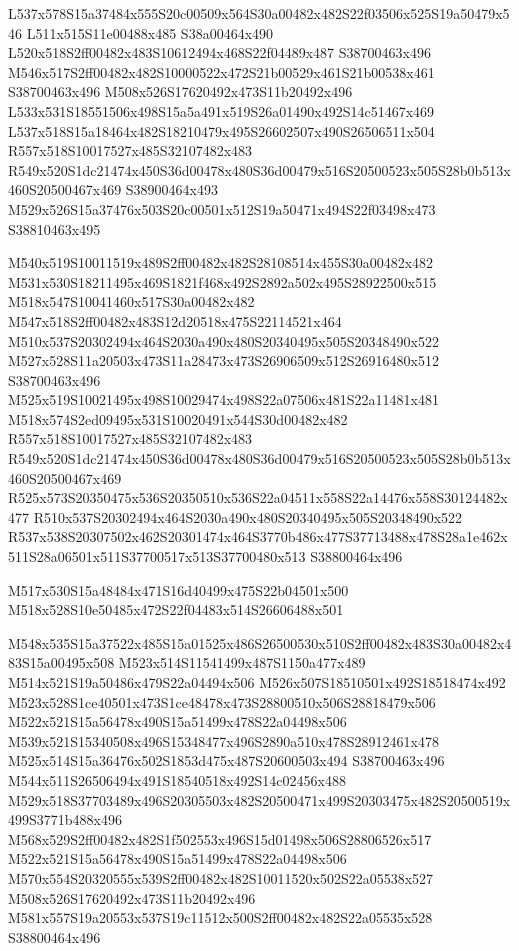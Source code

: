 \documentclass{article}
\begin{document}
\begin{multicols}{2}
L537x578S15a37484x555S20c00509x564S30a00482x482S22f03506x525S19a50479x546 L511x515S11e00488x485 S38a00464x490 L520x518S2ff00482x483S10612494x468S22f04489x487 S38700463x496 M546x517S2ff00482x482S10000522x472S21b00529x461S21b00538x461 S38700463x496 M508x526S17620492x473S11b20492x496 L533x531S18551506x498S15a5a491x519S26a01490x492S14c51467x469 L537x518S15a18464x482S18210479x495S26602507x490S26506511x504 R557x518S10017527x485S32107482x483 R549x520S1dc21474x450S36d00478x480S36d00479x516S20500523x505S28b0b513x460S20500467x469 S38900464x493 M529x526S15a37476x503S20c00501x512S19a50471x494S22f03498x473 S38810463x495

M540x519S10011519x489S2ff00482x482S28108514x455S30a00482x482 M531x530S18211495x469S1821f468x492S2892a502x495S28922500x515 M518x547S10041460x517S30a00482x482 M547x518S2ff00482x483S12d20518x475S22114521x464 M510x537S20302494x464S2030a490x480S20340495x505S20348490x522 M527x528S11a20503x473S11a28473x473S26906509x512S26916480x512 S38700463x496 M525x519S10021495x498S10029474x498S22a07506x481S22a11481x481 M518x574S2ed09495x531S10020491x544S30d00482x482 R557x518S10017527x485S32107482x483 R549x520S1dc21474x450S36d00478x480S36d00479x516S20500523x505S28b0b513x460S20500467x469 R525x573S20350475x536S20350510x536S22a04511x558S22a14476x558S30124482x477 R510x537S20302494x464S2030a490x480S20340495x505S20348490x522 R537x538S20307502x462S20301474x464S3770b486x477S37713488x478S28a1e462x511S28a06501x511S37700517x513S37700480x513 S38800464x496

\begin{center}
M517x530S15a48484x471S16d40499x475S22b04501x500 M518x528S10e50485x472S22f04483x514S26606488x501 
\end{center}


M548x535S15a37522x485S15a01525x486S26500530x510S2ff00482x483S30a00482x483S15a00495x508 M523x514S11541499x487S1150a477x489 M514x521S19a50486x479S22a04494x506 M526x507S18510501x492S18518474x492 M523x528S1ce40501x473S1ce48478x473S28800510x506S28818479x506 M522x521S15a56478x490S15a51499x478S22a04498x506 M539x521S15340508x496S15348477x496S2890a510x478S28912461x478 M525x514S15a36476x502S1853d475x487S20600503x494 S38700463x496 M544x511S26506494x491S18540518x492S14c02456x488 M529x518S37703489x496S20305503x482S20500471x499S20303475x482S20500519x499S3771b488x496 M568x529S2ff00482x482S1f502553x496S15d01498x506S28806526x517 M522x521S15a56478x490S15a51499x478S22a04498x506 M570x554S20320555x539S2ff00482x482S10011520x502S22a05538x527 M508x526S17620492x473S11b20492x496 M581x557S19a20553x537S19c11512x500S2ff00482x482S22a05535x528 S38800464x496


\end{multicols}
\end{document}
